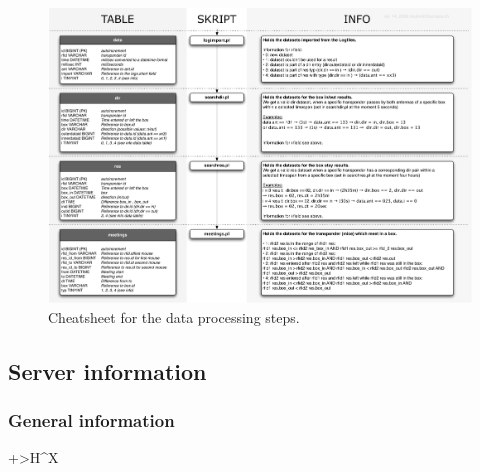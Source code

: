 \documentclass[a4paper,10pt,twoside,titlepage,headings=small,bibliography=totocnumbered,headsepline]{scrartcl}
\begin{document}
\begin{appendix}
\begin{table}
\end{table}

\begin{figure}
  \includegraphics[width=\textwidth]{assets/pdf/micedata_data_processing_cheatsheet.pdf}
  \caption[Data processing cheatsheet]{Cheatsheet for the data processing steps.}
  \label{fig:data_processing_cheatsheet}
\end{figure}

\newpage

\subsection{Server information}
\label{subsec:server_information}

\subsubsection{General information}
\label{subsubsec:general_sys_info}

\begin{table}
\begin{center} 
\renewcommand\arraystretch{1.5}%
\begin{tabularx}{\textwidth}{+>{\raggedleft\arraybackslash}H^X}


\end{tabularx}
\end{center}
\end{table}
\end{appendix}
\end{document}
